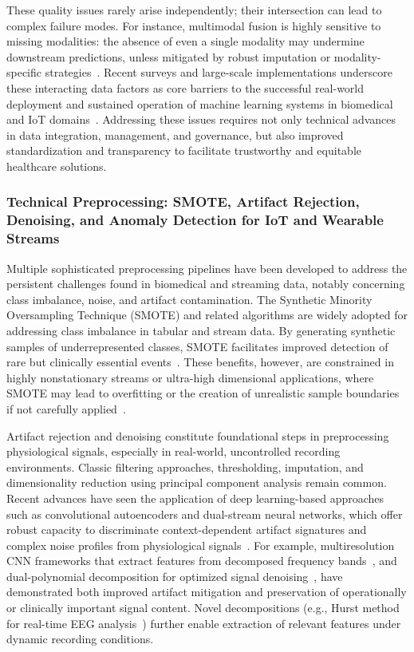\documentclass[sigconf]{acmart}
\begin{document}
These quality issues rarely arise independently; their intersection can lead to complex failure modes. For instance, multimodal fusion is highly sensitive to missing modalities: the absence of even a single modality may undermine downstream predictions, unless mitigated by robust imputation or modality-specific strategies~\cite{ref78}. Recent surveys and large-scale implementations underscore these interacting data factors as core barriers to the successful real-world deployment and sustained operation of machine learning systems in biomedical and IoT domains~\cite{ref78,ref84,ref106}. Addressing these issues requires not only technical advances in data integration, management, and governance, but also improved standardization and transparency to facilitate trustworthy and equitable healthcare solutions.

\subsubsection{Technical Preprocessing: SMOTE, Artifact Rejection, Denoising, and Anomaly Detection for IoT and Wearable Streams}

Multiple sophisticated preprocessing pipelines have been developed to address the persistent challenges found in biomedical and streaming data, notably concerning class imbalance, noise, and artifact contamination. The Synthetic Minority Oversampling Technique (SMOTE) and related algorithms are widely adopted for addressing class imbalance in tabular and stream data. By generating synthetic samples of underrepresented classes, SMOTE facilitates improved detection of rare but clinically essential events~\cite{ref89,ref102}. These benefits, however, are constrained in highly nonstationary streams or ultra-high dimensional applications, where SMOTE may lead to overfitting or the creation of unrealistic sample boundaries if not carefully applied~\cite{ref106}.

Artifact rejection and denoising constitute foundational steps in preprocessing physiological signals, especially in real-world, uncontrolled recording environments. Classic filtering approaches, thresholding, imputation, and dimensionality reduction using principal component analysis remain common. Recent advances have seen the application of deep learning-based approaches such as convolutional autoencoders and dual-stream neural networks, which offer robust capacity to discriminate context-dependent artifact signatures and complex noise profiles from physiological signals~\cite{ref96,ref97,ref102}. For example, multiresolution CNN frameworks that extract features from decomposed frequency bands~\cite{ref102}, and dual-polynomial decomposition for optimized signal denoising~\cite{ref97}, have demonstrated both improved artifact mitigation and preservation of operationally or clinically important signal content. Novel decompositions (e.g., Hurst method for real-time EEG analysis~\cite{ref96}) further enable extraction of relevant features under dynamic recording conditions.
\end{document}
